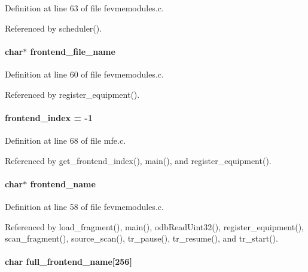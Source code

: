 Definition at line 63 of file fevmemodules.c.

Referenced by scheduler().
\paragraph[{frontend\_\-file\_\-name}]{\setlength{\rightskip}{0pt plus 5cm}char$\ast$ {\bf frontend\_\-file\_\-name}}\hfill\label{mfe_8c_ac7fc683b5a25d9607abc270a54db6d97}


Definition at line 60 of file fevmemodules.c.

Referenced by register\_\-equipment().
\paragraph[{frontend\_\-index}]{ {\bf frontend\_\-index} = -\/1}\hfill\label{mfe_8c_a922adac2edf2bc75a7d52bc6c5e2aeb4}


Definition at line 68 of file mfe.c.

Referenced by get\_\-frontend\_\-index(), main(), and register\_\-equipment().
\paragraph[{frontend\_\-name}]{\setlength{\rightskip}{0pt plus 5cm}char$\ast$ {\bf frontend\_\-name}}\hfill\label{mfe_8c_ac1f0c6df66e35778b61c611107501ec4}


Definition at line 58 of file fevmemodules.c.

Referenced by load\_\-fragment(), main(), odbReadUint32(), register\_\-equipment(), scan\_\-fragment(), source\_\-scan(), tr\_\-pause(), tr\_\-resume(), and tr\_\-start().
\paragraph[{full\_\-frontend\_\-name}]{\setlength{\rightskip}{0pt plus 5cm}char {\bf full\_\-frontend\_\-name}\mbox{[}256\mbox{]}}\hfill\label{mfe_8c_a98cf62d8ada1b93b7fb57612da25af6a}


